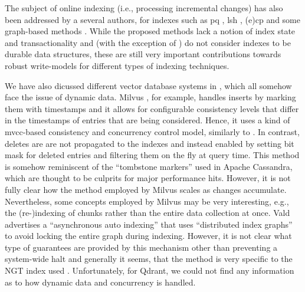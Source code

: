 The subject of online indexing (i.e., processing incremental changes) has also been addressed by a several authors, for indexes such as \acrshort{pq} \cite{Xu:2018Online}, \acrshort{lsh} \cite{Cakir:2015Adaptive}, (e)\acrshort{cp} \cite{Hojsgaard:2019Index} and some graph-based methods \cite{Zhao:2022Approximate}. While the proposed methods lack a notion of index state and transactionality and (with the exception of \cite{Hojsgaard:2019Index}) do not consider indexes to be durable data structures, these are still very important contributions towards robust write-models for different types of indexing techniques. 

We have also dicussed different vector database systems in , which all somehow face the issue of dynamic data. Milvus \cite{Wang:2021Milvus}, for example, handles inserts by marking them with timestamps and it allows for configurable consistency levels that differ in the timestamps of entries that are being considered. Hence, it uses a kind of \acrshort{mvcc}-based consistency and concurrency control model, similarly to \cottontail. In contrast, deletes are are not propagated to the indexes and instead enabled by setting bit mask for deleted entries and filtering them on the fly at query time. This method is somehow reminiscent of the ``tombstone markers'' used in Apache Cassandra, which are thought to be culprits for major performance hits. However, it is not fully clear how the method employed by Milvus scales as changes accumulate. Nevertheless, some concepts employed by Milvus may be very interesting, e.g., the (re-)indexing of chunks rather than the entire data collection at once. Vald  advertises a ``asynchronous auto indexing'' that uses ``distributed index graphs'' to avoid locking the entire graph during indexing. However, it is not clear what type of guarantees are provided by this mechanism other than preventing a system-wide halt and generally it seems, that the method is very specific to the NGT index used \cite{Iwasaki2016:Pruned}. Unfortunately, for Qdrant, we could not find any information as to how dynamic data and concurrency is handled.

